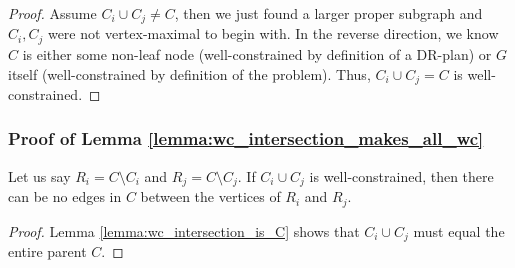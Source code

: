 \begin{proof}
Assume $C_i\cup C_j \neq C$, then we just found a larger proper subgraph and $C_i,C_j$ were not vertex-maximal to begin with.
%
In the reverse direction, we know $C$ is either some non-leaf node (well-constrained by definition of a DR-plan) or $G$ itself (well-constrained by definition of the problem). Thus, $C_i\cup C_j=C$ is well-constrained.
\end{proof}


\subsubsection{Proof of Lemma \ref{lemma:wc_intersection_makes_all_wc}}

\begin{corollary}\label{corollary:no_edges_between_diff}
Let us say $R_i=C\setminus C_i$ and $R_j=C\setminus C_j$. If $C_i\cup C_j$ is well-constrained, then there can be no edges in $C$ between the vertices of $R_i$ and $R_j$.
\end{corollary}

\begin{proof}
Lemma \ref{lemma:wc_intersection_is_C} shows that $C_i\cup C_j$ must equal the entire parent $C$.
\end{proof}


